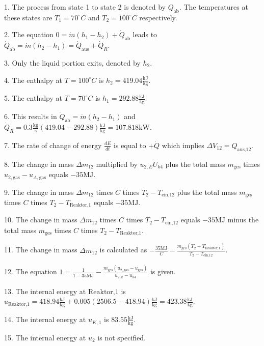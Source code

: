 1. The process from state 1 to state 2 is denoted by \( Q_{\text{ab}} \). The temperatures at these states are \( T_1 = 70^\circ C \) and \( T_2 = 100^\circ C \) respectively.

2. The equation \( 0 = \dot{m}(h_1 - h_2) + \dot{Q}_{\text{ab}} \) leads to \( \dot{Q}_{\text{ab}} = \dot{m}(h_2 - h_1) = \dot{Q}_{\text{aus}} + \dot{Q}_R \).

3. Only the liquid portion exits, denoted by \( h_2 \).

4. The enthalpy at \( T = 100^\circ C \) is \( h_2 = 419.04 \frac{\text{kJ}}{\text{kg}} \).

5. The enthalpy at \( T = 70^\circ C \) is \( h_1 = 292.88 \frac{\text{kJ}}{\text{kg}} \).

6. This results in \( \dot{Q}_{\text{ab}} = \dot{m}(h_2 - h_1) \) and \( \dot{Q}_R = 0.3 \frac{\text{kg}}{\text{s}} (419.04 - 292.88) \frac{\text{kJ}}{\text{kg}} = 107.818 \text{kW} \).

7. The rate of change of energy \( \frac{dE}{dt} \) is equal to \( + \dot{Q} \) which implies \( \Delta V_{12} = Q_{\text{aus,12}} \).

8. The change in mass \( \Delta m_{12} \) multiplied by \( u_{2,E} U_{k4} \) plus the total mass \( m_{\text{ges}} \) times \( u_{2,\text{gas}} - u_{A,\text{gas}} \) equals \(-35 \text{MJ}\).

9. The change in mass \( \Delta m_{12} \) times \( C \) times \( T_2 - T_{\text{ein,12}} \) plus the total mass \( m_{\text{ges}} \) times \( C \) times \( T_2 - T_{\text{Reaktor,1}} \) equals \(-35 \text{MJ}\).

10. The change in mass \( \Delta m_{12} \) times \( C \) times \( T_2 - T_{\text{ein,12}} \) equals \(-35 \text{MJ}\) minus the total mass \( m_{\text{ges}} \) times \( C \) times \( T_2 - T_{\text{Reaktor,1}} \).

11. The change in mass \( \Delta m_{12} \) is calculated as \(-\frac{35 \text{MJ}}{C} - \frac{m_{\text{ges}} \left( T_2 - T_{\text{Reaktor,1}} \right)}{T_2 - T_{\text{ein,12}}}\).

12. The equation \( 1 = \frac{1}{1 - 35 \text{MJ}} - \frac{m_{\text{ges}} \left( u_{2,\text{gas}} - u_{\text{gas}} \right)}{u_{2,k} - u_{k4}} \) is given.

13. The internal energy at \( \text{Reaktor,1} \) is \( u_{\text{Reaktor,1}} = 418.94 \frac{\text{kJ}}{\text{kg}} + 0.005 \left( 2506.5 - 418.94 \right) \frac{\text{kJ}}{\text{kg}} = 423.38 \frac{\text{kJ}}{\text{kg}} \).

14. The internal energy at \( u_{K,1} \) is \( 83.55 \frac{\text{kJ}}{\text{kg}} \).

15. The internal energy at \( u_2 \) is not specified.
